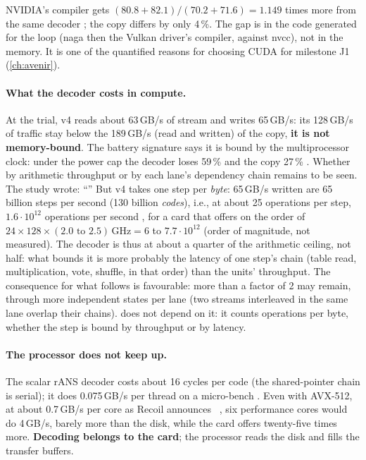 NVIDIA's compiler gets $(80.8 + 82.1)/(70.2 + 71.6) = 1.149$ times more from the same decoder \calc; the copy differs by only 4\,\%. The gap is in the code generated for the loop (naga then the Vulkan driver's compiler, against nvcc), not in the memory. It is one of the quantified reasons for choosing CUDA for milestone J1 (\cref{ch:avenir}).

\paragraph{What the decoder costs in compute.} At the trial, v4 reads about 63\,GB/s of stream and writes 65\,GB/s: its 128\,GB/s of traffic stay below the 189\,GB/s (read and written) of the copy, \textbf{it is not memory-bound}. The battery signature says it is bound by the multiprocessor clock: under the power cap the decoder loses 59\,\% and the copy 27\,\% \mes. Whether by arithmetic throughput or by each lane's dependency chain remains to be seen. The study wrote: \enquote{} But v4 takes one step per \emph{byte}: 65\,GB/s written are 65 billion steps per second (130 billion \emph{codes}), i.e., at about 25 operations per step, $1.6\cdot10^{12}$ operations per second \calc, for a card that offers on the order of $24 \times 128 \times (2.0 \text{ to } 2.5)\,\text{GHz} = 6$ to $7.7\cdot10^{12}$ (order of magnitude, not measured). The decoder is thus at about a quarter of the arithmetic ceiling, not half: what bounds it is more probably the latency of one step's chain (table read, multiplication, vote, shuffle, in that order) than the units' throughput. The consequence for what follows is favourable: more than a factor of 2 may remain, through more independent states per lane (two streams interleaved in the same lane overlap their chains).  does not depend on it: it counts operations per byte, whether the step is bound by throughput or by latency.

\paragraph{The processor does not keep up.} The scalar rANS decoder costs about 16 cycles per code (the shared-pointer chain is serial); it does 0.075\,GB/s per thread on a micro-bench \mes. Even with AVX-512, at about 0.7\,GB/s per core as Recoil announces~\cite{lin2023recoil} \litt, six performance cores would do 4\,GB/s, barely more than the disk, while the card offers twenty-five times more. \textbf{Decoding belongs to the card}; the processor reads the disk and fills the transfer buffers.

